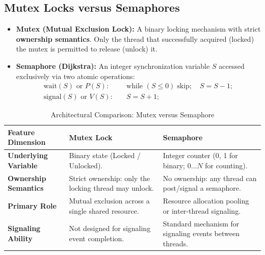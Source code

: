 \subsection{Mutex Locks versus Semaphores}
\begin{itemize}
    \item \textbf{Mutex (Mutual Exclusion Lock):} A binary locking mechanism with strict \textbf{ownership semantics}. Only the thread that successfully acquired (locked) the mutex is permitted to release (unlock) it.
    \item \textbf{Semaphore (Dijkstra):} An integer synchronization variable $S$ accessed exclusively via two atomic operations:
    \begin{align}
    \text{wait}(S) \text{ or } P(S): & \quad \text{while } (S \le 0) \; \text{skip}; \quad S = S - 1; \\
    \text{signal}(S) \text{ or } V(S): & \quad S = S + 1;
    \end{align}
\end{itemize}

\begin{table}[htbp]
\centering
\small
\caption{Architectural Comparison: Mutex versus Semaphore}
\label{tab:mutex_vs_semaphore}
\begin{tabularx}{\textwidth}{p{3.2cm} X X}
\toprule
\textbf{Feature Dimension} & \textbf{Mutex Lock} & \textbf{Semaphore} \\
\midrule
\textbf{Underlying Variable} & Binary state (Locked / Unlocked). & Integer counter (0, 1 for binary; $0 \dots N$ for counting). \\
\textbf{Ownership Semantics} & Strict ownership: only the locking thread may unlock. & No ownership: any thread can post/signal a semaphore. \\
\textbf{Primary Role} & Mutual exclusion across a single shared resource. & Resource allocation pooling or inter-thread signaling. \\
\textbf{Signaling Ability} & Not designed for signaling event completion. & Standard mechanism for signaling events between threads. \\
\bottomrule
\end{tabularx}
\end{table}




